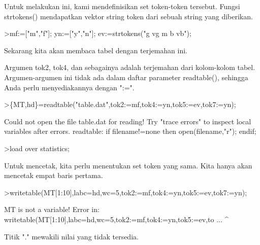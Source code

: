 \documentclass[a4paper,10pt]{article}
\begin{document}
\begin{eulernotebook}
\begin{eulercomment}
Untuk melakukan ini, kami mendefinisikan set token-token tersebut.
Fungsi strtokens() mendapatkan vektor string token dari sebuah string
yang diberikan.
\end{eulercomment}
\begin{eulerprompt}
>mf:=["m","f"]; yn:=["y","n"]; ev:=strtokens("g vg m b vb");
\end{eulerprompt}
\begin{eulercomment}
Sekarang kita akan membaca tabel dengan terjemahan ini.

Argumen tok2, tok4, dan sebagainya adalah terjemahan dari kolom-kolom
tabel. Argumen-argumen ini tidak ada dalam daftar parameter
readtable(), sehingga Anda perlu menyediakannya dengan ":=".
\end{eulercomment}
\begin{eulerprompt}
>\{MT,hd\}=readtable("table.dat",tok2:=mf,tok4:=yn,tok5:=ev,tok7:=yn);
\end{eulerprompt}
\begin{euleroutput}
  Could not open the file
  table.dat
  for reading!
  Try "trace errors" to inspect local variables after errors.
  readtable:
      if filename!=none then open(filename,"r"); endif;
\end{euleroutput}
\begin{eulerprompt}
>load over statistics;
\end{eulerprompt}
\begin{eulercomment}
Untuk mencetak, kita perlu menentukan set token yang sama. Kita hanya
akan mencetak empat baris pertama.
\end{eulercomment}
\begin{eulerprompt}
>writetable(MT[1:10],labc=hd,wc=5,tok2:=mf,tok4:=yn,tok5:=ev,tok7:=yn);
\end{eulerprompt}
\begin{euleroutput}
  MT is not a variable!
  Error in:
  writetable(MT[1:10],labc=hd,wc=5,tok2:=mf,tok4:=yn,tok5:=ev,to ...
                     ^
\end{euleroutput}
\begin{eulercomment}
Titik "." mewakili nilai yang tidak tersedia.


\end{eulercomment}
\end{eulernotebook}
\end{document}
